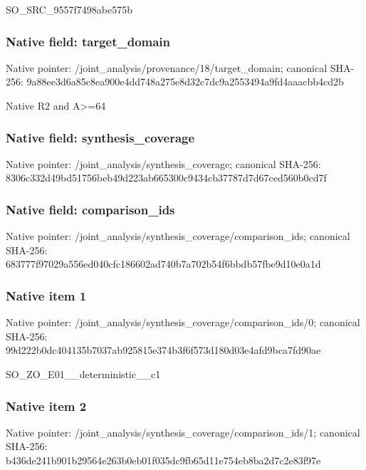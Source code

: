 \documentclass[10pt,a4paper]{article}
\begin{document}
\begingroup\raggedright\sloppy SO\_\allowbreak{}SRC\_\allowbreak{}9557f7498abe575b\par\endgroup

\subsubsection{Native field: target\_\allowbreak{}domain}
Native pointer: /joint\_\allowbreak{}analysis/provenance/18/target\_\allowbreak{}domain; canonical SHA-256: 9a88ee3d6a85c8ea900e4dd748a275e8d32c7dc9a2553494a9fd4aaacbb4cd2b

\begingroup\raggedright\sloppy Native R2 and A>=\allowbreak{}64\par\endgroup

\subsubsection{Native field: synthesis\_\allowbreak{}coverage}
Native pointer: /joint\_\allowbreak{}analysis/synthesis\_\allowbreak{}coverage; canonical SHA-256: 8306c332d49bd51756beb49d223ab665300c9434cb37787d7d67ced560b0cd7f

\subsubsection{Native field: comparison\_\allowbreak{}ids}
Native pointer: /joint\_\allowbreak{}analysis/synthesis\_\allowbreak{}coverage/comparison\_\allowbreak{}ids; canonical SHA-256: 683777f97029a556ed040cfc186602ad740b7a702b54f6bbdb57fbe9d10e0a1d

\subsubsection{Native item 1}
Native pointer: /joint\_\allowbreak{}analysis/synthesis\_\allowbreak{}coverage/comparison\_\allowbreak{}ids/0; canonical SHA-256: 99d222b0dc404135b7037ab925815e374b3f6f573d180d03e4afd9bca7fd90ae

\begingroup\raggedright\sloppy SO\_\allowbreak{}ZO\_\allowbreak{}E01\_\allowbreak{}\_\allowbreak{}deterministic\_\allowbreak{}\_\allowbreak{}c1\par\endgroup

\subsubsection{Native item 2}
Native pointer: /joint\_\allowbreak{}analysis/synthesis\_\allowbreak{}coverage/comparison\_\allowbreak{}ids/1; canonical SHA-256: b436de241b901b29564e263b0eb01f035dc9fb65d11e754eb8ba2d7c2e83f97e
\end{document}
